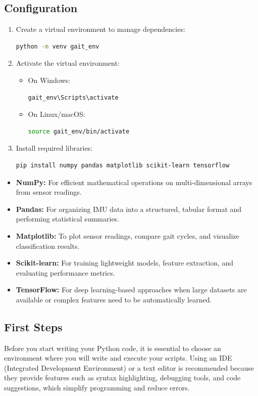 	\subsection*{Configuration}
	\begin{enumerate}
		\item Create a virtual environment to manage dependencies:
		\begin{lstlisting}[language=bash]
			python -m venv gait_env
		\end{lstlisting}
		\item Activate the virtual environment:
		\begin{itemize}
			\item On Windows:
			\begin{lstlisting}[language=bash]
				gait_env\Scripts\activate
			\end{lstlisting}
			\item On Linux/macOS:
			\begin{lstlisting}[language=bash]
				source gait_env/bin/activate
			\end{lstlisting}
		\end{itemize}
		\item Install required libraries:
		\begin{lstlisting}[language=bash]
			pip install numpy pandas matplotlib scikit-learn tensorflow
		\end{lstlisting}
	\end{enumerate}
	\begin{itemize}
		\item \textbf{NumPy:} For efficient mathematical operations on multi-dimensional arrays from sensor readings\cite{NumPy:2024}.
		\item \textbf{Pandas:} For organizing IMU data into a structured, tabular format and performing statistical summaries\cite{Pandas:2024}.
		\item \textbf{Matplotlib:} To plot sensor readings, compare gait cycles, and visualize classification results\cite{Matplotlib:2024}.
		\item \textbf{Scikit-learn:} For training lightweight models, feature extraction, and evaluating performance metrics\cite{Scikit-Learn:2024}.
		\item \textbf{TensorFlow:} For deep learning-based approaches when large datasets are available or complex features need to be automatically learned\cite{TensorFlow:2024}.
	\end{itemize}
	\subsection*{First Steps}
	Before you start writing your Python code, it is essential to choose an environment where you will write and execute your scripts. Using an IDE (Integrated Development Environment) or a text editor is recommended because they provide features such as syntax highlighting, debugging tools, and code suggestions, which simplify programming and reduce errors.\cite{PythonGuide:2023}
	
